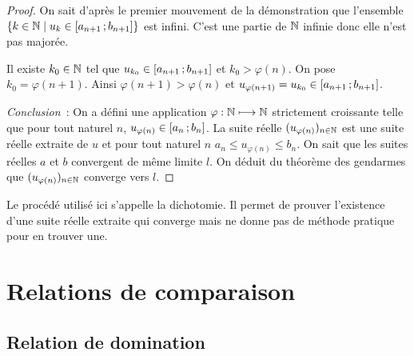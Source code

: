 \begin{proof}
On sait d'après le premier mouvement de la démonstration que l'ensemble $\left\{k \in \mathbb{N}\mathrel{}\middle|\mathrel{}u_k \in \left[ a_{n+1} \, ;  b_{n+1} \right]\right\}$ est infini. C'est une partie de $\mathbb{N}$ infinie donc elle n'est pas majorée.

Il existe $k_0 \in \mathbb{N}$ tel que $u_{k_0}\in \left[ a_{n+1} \, ;  b_{n+1} \right]$ et $k_0 > \varphi(n)$. On pose $k_0=\varphi(n+1)$. Ainsi $\varphi(n+1) > \varphi(n)$ et $u_{\varphi(n+1)}=u_{k_0}\in \left[ a_{n+1} \, ;  b_{n+1} \right]$.

\emph{Conclusion}~: On a défini une application $\varphi : \mathbb{N} \longmapsto \mathbb{N}$ strictement croissante telle que pour tout naturel $n$, $u_{\varphi(n)} \in \left[ a_{n} \, ;  b_{n} \right]$. La suite réelle $(u_{\varphi(n)})_{n \in \mathbb{N}}$ est une suite réelle extraite de $u$ et pour tout naturel $n$ $a_n \leq u_{\varphi(n)} \leq b_n$. On sait que les suites réelles $a$ et $b$ convergent de même limite $l$. On déduit du théorème des gendarmes que $(u_{\varphi(n)})_{n \in \mathbb{N}}$ converge vers $l$.
\end{proof}

Le procédé utilisé ici s'appelle la dichotomie. Il permet de prouver l'existence d'une suite réelle extraite qui converge mais ne donne pas de méthode pratique pour en trouver une.

\section{Relations de comparaison}

\subsection{Relation de domination}

